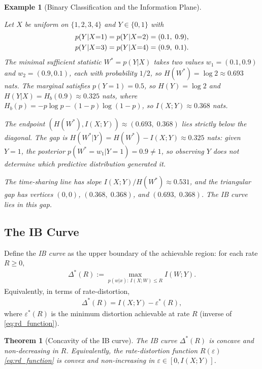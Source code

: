 \documentclass[11pt]{article}
\newtheorem{theorem}{Theorem}
\newtheorem{example}{Example}
\begin{document}
\begin{example}[Binary Classification and the Information Plane]
\label{ex:binary_example}

Let $X$ be uniform on $\{1,2,3,4\}$ and $Y\in\{0,1\}$ with
\begin{align}
    p(Y|X{=}1) = p(Y|X{=}2) &= (0.1,\;0.9), \notag\\
    p(Y|X{=}3) = p(Y|X{=}4) &= (0.9,\;0.1).
    \label{eq:binary_ex}
\end{align}
The minimal sufficient statistic $W^*=p(Y|X)$ takes two values
$w_1=(0.1,0.9)$ and $w_2=(0.9,0.1)$, each with probability $1/2$, so
$H(W^*)=\log 2\approx 0.693$ nats.
The marginal satisfies $p(Y{=}1)=0.5$, so $H(Y)=\log 2$ and
$H(Y|X)=H_b(0.9)\approx 0.325$ nats, where
$H_b(p)=-p\log p-(1-p)\log(1-p)$, so $I(X;Y)\approx 0.368$ nats.

The endpoint $(H(W^*),I(X;Y))\approx(0.693,\;0.368)$ lies strictly
below the diagonal.
The gap is $H(W^*|Y)=H(W^*)-I(X;Y)\approx 0.325$ nats:
given $Y=1$, the posterior $p(W^*{=}w_1|Y{=}1)=0.9\neq 1$,
so observing $Y$ does not determine which predictive distribution
generated it.

The time-sharing line has slope $I(X;Y)/H(W^*)\approx 0.531$, and the
triangular gap has vertices $(0,0)$, $(0.368,\;0.368)$, and $(0.693,\;0.368)$.
The IB curve lies in this gap.

\end{example}

\subsection{The IB Curve}
\label{sec:ibcurve}

Define the \textit{IB curve} as the upper boundary of the achievable
region: for each rate $R\geq 0$,
\begin{align}
    \Delta^*(R) := \max_{p(w|x):\,I(X;W)\leq R} I(W;Y).
    \label{eq:ib_curve_def}
\end{align}
Equivalently, in terms of rate-distortion,
\begin{align}
    \Delta^*(R) = I(X;Y) - \varepsilon^*(R),
    \label{eq:ib_rd}
\end{align}
where $\varepsilon^*(R)$ is the minimum distortion achievable at rate
$R$ (inverse of \eqref{eq:rd_function}).

\begin{theorem}[Concavity of the IB curve]
\label{thm:convex}
The IB curve $\Delta^*(R)$ is concave and non-decreasing in $R$.
Equivalently, the rate-distortion function $R(\varepsilon)$ \eqref{eq:rd_function} is convex and
non-increasing in $\varepsilon\in[0,I(X;Y)]$.
\end{theorem}
\end{document}
